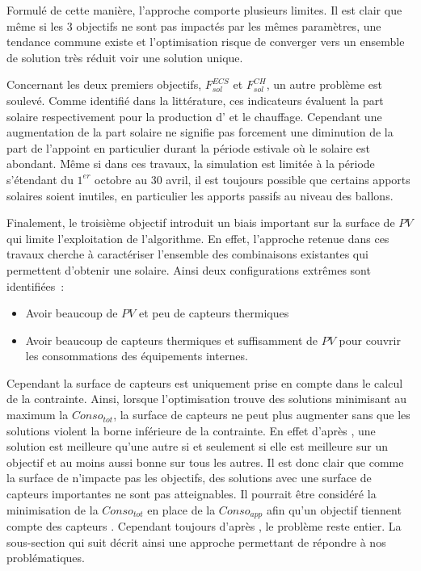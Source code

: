 Formulé de cette manière, l’approche comporte plusieurs limites. Il est clair que même si
les \num{3} objectifs ne sont pas impactés par les mêmes paramètres, une tendance commune
existe et l’optimisation risque de converger vers un ensemble de solution très réduit voir
une solution unique.

Concernant les deux premiers objectifs, $F_{sol}^{ECS}$ et $F_{sol}^{CH}$, un autre
problème est soulevé. Comme identifié dans la littérature, ces indicateurs évaluent la
part solaire respectivement pour la production d’ et le chauffage. Cependant une
augmentation de la part solaire ne signifie pas forcement une diminution de la part de
l’appoint en particulier durant la période estivale où le solaire est abondant. Même si
dans ces travaux, la simulation est limitée à la période s’étendant du $1^{er}$ octobre
au $30$ avril, il est toujours possible que certains apports solaires soient inutiles, en
particulier les apports passifs au niveau des ballons.

Finalement, le troisième objectif introduit un biais important sur la surface de $PV$
qui limite l’exploitation de l’algorithme. En effet, l’approche retenue dans ces travaux
cherche à caractériser l’ensemble des combinaisons existantes qui permettent d’obtenir
une  solaire. Ainsi deux configurations extrêmes sont identifiées~:
\begin{itemize}
  \item Avoir beaucoup de $PV$ et peu de capteurs thermiques
  \item Avoir beaucoup de capteurs thermiques et suffisamment de $PV$ pour couvrir
        les consommations des équipements internes.
\end{itemize}
Cependant la surface de capteurs  est uniquement prise en compte dans le calcul de
la contrainte. Ainsi, lorsque l’optimisation trouve des solutions minimisant au maximum la
$Conso_{tot}$, la surface de capteurs  ne peut plus augmenter sans que les
solutions violent la borne inférieure de la contrainte. En effet d’après
, une solution est meilleure qu’une autre si et seulement
si elle est meilleure sur un objectif et au moins aussi bonne sur tous les autres. Il est
donc clair que comme la surface de  n’impacte pas les objectifs, des solutions
avec une surface de capteurs  importantes ne sont pas atteignables. Il pourrait
être considéré la minimisation de la $Conso_{tot}$ en place de la $Conso_{app}$ afin qu’un
objectif tiennent compte des capteurs . Cependant toujours d’après
, le problème reste entier. La sous-section qui suit
décrit ainsi une approche permettant de répondre à nos problématiques.


